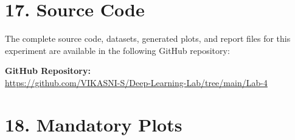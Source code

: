 \documentclass[11pt]{article}
\begin{document}

\section*{17. Source Code}


The complete source code, datasets, generated plots, and report files for this experiment are available in the following GitHub repository:



\noindent\textbf{GitHub Repository:} \\
\url{https://github.com/VIKASNI-S/Deep-Learning-Lab/tree/main/Lab-4}\\


\section*{18. Mandatory Plots}
\end{document}
